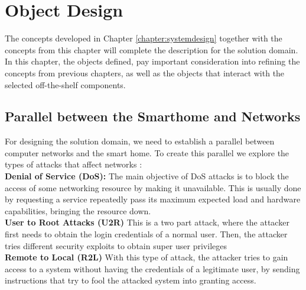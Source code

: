 \chapter{Object Design}
\label{chapter:objectdesign}
The concepts developed in Chapter \ref{chapter:systemdesign} together with the concepts from this chapter will complete the description for the solution domain.
In this chapter, the objects defined, pay important consideration into refining the concepts from previous chapters, as well as the objects that interact with the selected off-the-shelf components. 


\section{Parallel between the Smarthome and Networks}
\label{parallel}
For designing the solution domain, we need to establish a parallel between computer networks and the smart home. To create this parallel we explore the types of attacks that affect networks \cite{Bhattacharyya:2013:NAD:2505468}:\\
\textbf{Denial of Service (DoS):} The main objective of DoS attacks is to block the access of some networking resource by making it unavailable. This is usually done by requesting a service repeatedly pass its maximum expected load and hardware capabilities, bringing the resource down.\\
\textbf{User to Root Attacks (U2R)} This is a two part attack, where the attacker first needs to obtain the login credentials of a normal user. Then, the attacker tries different security exploits to obtain super user privileges \\
\textbf{Remote to Local (R2L)} With this type of attack, the attacker tries to gain access to a system without having the credentials of a legitimate user, by sending instructions that try to fool the attacked system into granting access. 

